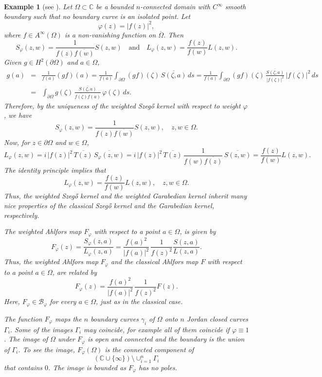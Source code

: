 \documentclass[11pt, reqno]{amsart}
\newtheorem{exam}[thm]{Example}
\numberwithin{equation}{section}
\newcommand{\Om}{\Omega}
\begin{document}
	\begin{exam}[see \cite{Nehari, zynda}]\label{mainexam}
		Let $\Omega\subset\mathbb{C}$ be a bounded $n$-connected domain with $C^{\infty}$ smooth boundary such that no boundary curve is an isolated point. Let 
		\[
		\varphi(z) = \vert f(z)\vert^2,
		\]
		where $f\in A^{\infty}(\Omega)$ is a non-vanishing function on $\overline{\Om}$.  Then
		\[
		S_{\varphi}(z,w) = \frac{1}{f(z)\overline{f(w)}} S(z,w)
		\quad\text{and}\quad
		L_{\varphi}(z,w)  = \frac{f(z)}{f(w)} L(z,w).
		\]
		Given $g\in H^2(\partial\Omega)$ and $a\in\Om$,
		\begin{eqnarray*}
			g(a) 
			&=&
			\frac{1}{f(a)} (gf)(a)
			=
			\frac{1}{f(a)} \int_{\partial\Om} (gf)(\zeta) \,\overline{S(\zeta,a)} \,ds
			=
			\frac{1}{f(a)} \int_{\partial\Om}(gf)(\zeta) \, \frac{\overline{S(\zeta,a)}}{\vert f(\zeta)\vert^2}\, \vert f(\zeta)\vert^2\, ds
			\\&=&
			\int_{\partial\Om}g(\zeta) \, \frac{\overline{S(\zeta,a)}}{\overline{f(\zeta)}f(a)}\, \varphi(\zeta)\, ds.
		\end{eqnarray*}
		Therefore, by the uniqueness of the weighted Szeg\H{o} kernel with respect to weight $\varphi$, we have
		\[
		S_{\varphi}(z,w) = \frac{1}{f(z)\overline{f(w)}} S(z,w),\quad z,w\in\Om.
		\]
		Now, for $z\in\partial\Om$ and $w\in\Om$,
		\[
		L_{\varphi}(z,w) 
		=
		i \,\vert f(z)\vert^2\, \overline{T(z)}\, \overline{S_{\varphi}(z,w)} 
		=
		i \,\vert f(z)\vert^2\, \overline{T(z)}\, \frac{1}{f(w)\overline{f(z)}}\,\overline{S(z,w)} 
		=
		\frac{f(z)}{f(w)} L(z,w).
		\]	
		The identity principle implies that
		\[
		L_{\varphi}(z,w)  = \frac{f(z)}{f(w)} L(z,w), 
		\quad z,w\in\Om.
		\]
		Thus, the weighted Szeg\H{o} kernel and the weighted Garabedian kernel inherit many nice properties of the classical Szeg\H{o} kernel and the Garabedian kernel, respectively.
		
		\medskip
		
		The weighted Ahlfors map $F_{\varphi}$ with respect to a point $a\in \Om$, is given by
		\[
		F_{\varphi}(z) = \frac{S_{\varphi}(z,a)}{L_{\varphi}(z,a)} 
		=
		\frac{f(a)^2}{\vert f(a)\vert^2} \, \frac{1}{f(z)^2} \frac{S(z,a)}{L(z,a)}.
		\]
		Thus, the weighted Ahlfors map $F_{\varphi}$ and the classical Ahlfors map $F$ with respect to a point $a\in\Om$, are related by
		\[
		F_{\varphi}(z) = \frac{f(a)^2}{\vert f(a)\vert^2} \, \frac{1}{f(z)^2} F(z).
		\]
		Here, $F_{\varphi}\in \mathcal{B}_{\varphi}$ for every $a\in\Om$, just as in the classical case.
		
		\medskip
		
		The function $F_{\varphi}$ maps the $n$ boundary curves $\gamma_i$ of $\Om$ onto $n$ Jordan closed curves $\Gamma_i$. Some of the images $\Gamma_i$ may coincide, for example all of them coincide if $\varphi\equiv 1$. The image of $\Om$ under $F_{\varphi}$ is open and connected and the boundary is the union of $\Gamma_i$. To see the image, $F_{\varphi}(\Om)$ is the connected component of 
		\[
		(\mathbb{C}\cup\{\infty\} )\setminus \cup_{i=1}^n\Gamma_i
		\]
		that contains $0$. The image is bounded as $F_{\varphi}$ has no poles.
	\end{exam}
	
\end{document}
